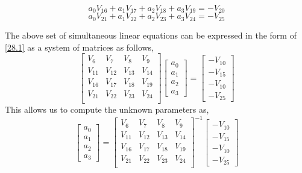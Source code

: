 \documentclass{article}
\begin{document}
\begin{equation}\label{eqn.129}
a_{0} V_{16} + a_{1}V_{17} + a_{2}V_{18} + a_{3}V_{19} = -V_{20}
\end{equation}
\begin{equation}\label{eqn.129.5}
a_{0} V_{21} + a_{1}V_{22} + a_{2}V_{23} + a_{3}V_{24} = -V_{25}
\end{equation}
\par The above set of simultaneous linear equations can be expressed in the form of \eqref{28.1} as a system of matrices as follows,
\begin{equation}\label{eqn.130}
\begin{bmatrix}
	V_{6}&V_{7}&V_{8}&V_{9}\\
	V_{11}&V_{12}&V_{13}&V_{14}\\
	V_{16}&V_{17}&V_{18}&V_{19}\\
	V_{21}&V_{22}&V_{23}&V_{24}\\
\end{bmatrix}
\begin{bmatrix}
	a_{0}\\
	a_{1}\\
	a_{2}\\
	a_{3}
\end{bmatrix}
=\begin{bmatrix}
	-V_{10}\\
	-V_{15}\\
	-V_{10}\\
	-V_{25}
\end{bmatrix}
\end{equation}
This allows us to compute the unknown parameters as,
\begin{equation}\label{eqn.131}
\begin{bmatrix}
	a_{0}\\
	a_{1}\\
	a_{2}\\
	a_{3}
\end{bmatrix}
={\begin{bmatrix}
	V_{6}&V_{7}&V_{8}&V_{9}\\
	V_{11}&V_{12}&V_{13}&V_{14}\\
	V_{16}&V_{17}&V_{18}&V_{19}\\
	V_{21}&V_{22}&V_{23}&V_{24}\\
\end{bmatrix}}^{-1}
\begin{bmatrix}
	-V_{10}\\
	-V_{15}\\
	-V_{10}\\
	-V_{25}
\end{bmatrix}
\end{equation}
\end{document}
